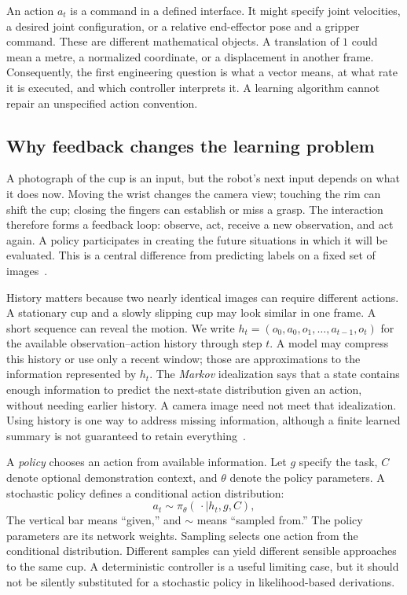 An action $a_t$ is a command in a defined interface. It might specify joint velocities, a desired joint configuration, or a relative end-effector pose and a gripper command. These are different mathematical objects. A translation of $1$ could mean a metre, a normalized coordinate, or a displacement in another frame. Consequently, the first engineering question is what a vector means, at what rate it is executed, and which controller interprets it. A learning algorithm cannot repair an unspecified action convention.

\subsection{Why feedback changes the learning problem}
A photograph of the cup is an input, but the robot's next input depends on what it does now. Moving the wrist changes the camera view; touching the rim can shift the cup; closing the fingers can establish or miss a grasp. The interaction therefore forms a feedback loop: observe, act, receive a new observation, and act again. A policy participates in creating the future situations in which it will be evaluated. This is a central difference from predicting labels on a fixed set of images~\citep{dagger}.

History matters because two nearly identical images can require different actions. A stationary cup and a slowly slipping cup may look similar in one frame. A short sequence can reveal the motion. We write $h_t=(o_0,a_0,o_1,\ldots,a_{t-1},o_t)$ for the available observation--action history through step $t$. A model may compress this history or use only a recent window; those are approximations to the information represented by $h_t$. The \emph{Markov} idealization says that a state contains enough information to predict the next-state distribution given an action, without needing earlier history. A camera image need not meet that idealization. Using history is one way to address missing information, although a finite learned summary is not guaranteed to retain everything~\citep{rlintro}.

A \emph{policy} chooses an action from available information. Let $g$ specify the task, $C$ denote optional demonstration context, and $\theta$ denote the policy parameters. A stochastic policy defines a conditional action distribution:
\begin{equation}
 a_t\sim\pi_\theta(\,\cdot\mid h_t,g,C),
 \label{eq:policy}
\end{equation}
The vertical bar means ``given,'' and $\sim$ means ``sampled from.'' The policy parameters are its network weights. Sampling selects one action from the conditional distribution. Different samples can yield different sensible approaches to the same cup. A deterministic controller is a useful limiting case, but it should not be silently substituted for a stochastic policy in likelihood-based derivations.

